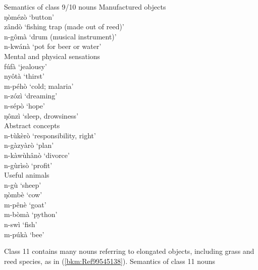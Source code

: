 \ea
\label{bkm:Ref99545117}
  Semantics of class 9/10 nouns
\ea
Manufactured objects \\
ŋòmézò \tab ‘button’\\
zândò \tab ‘fishing trap (made out of reed)’\\
n-gômà \tab ‘drum (musical instrument)’\\
n-kwánà \tab ‘pot for beer or water’\\
\ex Mental and physical sensations \\
fúfà \tab ‘jealousy’\\
nyôtà \tab ‘thirst’\\
m-péhò \tab ‘cold; malaria’\\
n-zózì\footnotemark{} \tab ‘dreaming’\\
n-sépò \tab ‘hope’\\
ŋônzì \tab ‘sleep, drowsiness’\\
\ex Abstract concepts \\
n-tùkèrò \tab ‘responsibility, right’\\
n-gàzyàrò \tab ‘plan’\\
n-kàwùhânò \tab ‘divorce’\\
n-gùrìsò \tab ‘profit’\\
\ex Useful animals \\
n-gù \tab ‘sheep’\\
ŋòmbè \tab ‘cow’\\
m-pênè \tab ‘goat’\\
m-bòmà \tab ‘python’\footnotemark{}\\
n-swì \tab ‘fish’\\
m-púkà \tab ‘bee’\\
\z\z

\addtocounter{footnote}{-2}

Class 11 contains many nouns referring to elongated objects, including grass and reed species, as in (\ref{bkm:Ref99545138}).
\ea
\label{bkm:Ref99545138}
  Semantics of class 11 nouns

